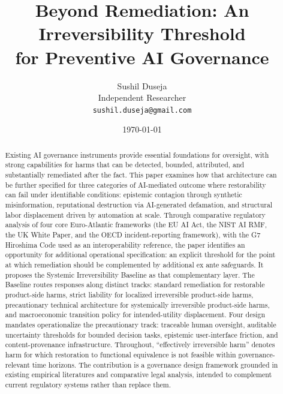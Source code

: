\documentclass[11pt]{article}
\begin{document}
\title{\textbf{Beyond Remediation: An Irreversibility Threshold\\ for Preventive AI Governance}}
\author{Sushil Duseja\\
  Independent Researcher\\
  \texttt{sushil.duseja@gmail.com}}
\date{\today}
\maketitle

\begin{abstract}
\noindent Existing AI governance instruments provide essential foundations for oversight, with strong capabilities for harms that can be detected, bounded, attributed, and substantially remediated after the fact. This paper examines how that architecture can be further specified for three categories of AI-mediated outcome where restorability can fail under identifiable conditions: epistemic contagion through synthetic misinformation, reputational destruction via AI-generated defamation, and structural labor displacement driven by automation at scale. Through comparative regulatory analysis of four core Euro-Atlantic frameworks (the EU AI Act, the NIST AI RMF, the UK White Paper, and the OECD incident-reporting framework), with the G7 Hiroshima Code used as an interoperability reference, the paper identifies an opportunity for additional operational specification: an explicit threshold for the point at which remediation should be complemented by additional ex ante safeguards. It proposes the Systemic Irreversibility Baseline as that complementary layer. The Baseline routes responses along distinct tracks: standard remediation for restorable product-side harms, strict liability for localized irreversible product-side harms, precautionary technical architecture for systemically irreversible product-side harms, and macroeconomic transition policy for intended-utility displacement. Four design mandates operationalize the precautionary track: traceable human oversight, auditable uncertainty thresholds for bounded decision tasks, epistemic user-interface friction, and content-provenance infrastructure. Throughout, ``effectively irreversible harm'' denotes harm for which restoration to functional equivalence is not feasible within governance-relevant time horizons. The contribution is a governance design framework grounded in existing empirical literatures and comparative legal analysis, intended to complement current regulatory systems rather than replace them.
\end{abstract}
\end{document}
